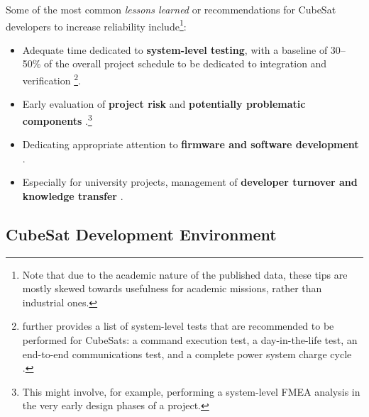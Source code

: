 \documentclass[a4paper,nobib,justified,final]{tufte-book}
\begin{document}
Some of the most common \emph{lessons learned} or recommendations for CubeSat developers to increase reliability include\footnote{Note that due to the academic nature of the published data, these tips are mostly skewed towards usefulness for academic missions, rather than industrial ones.}:\label{sec:LITERATURE_cubesat_systemic}
\begin{itemize}[itemsep=-1ex]
	\item Adequate time dedicated to \textbf{system-level testing}, with a baseline of 30--50\% of the overall project schedule to be dedicated to integration and verification
	\cite{swartwoutUniversityClassSpacecraft2023,venturiniImprovingMissionSuccess2017,langerReliabilityAssessmentReliability2018}\footnote{\citeauthor{venturiniImprovingMissionSuccess2017} further provides a list of system-level tests that are recommended to be performed for CubeSats: a command execution test, a day-in-the-life test, an end-to-end communications test, and a complete power system charge cycle \cite{venturiniImprovingMissionSuccess2017}.}.
	\item Early evaluation of \textbf{project risk} and \textbf{potentially problematic components} \cite{venturiniImprovingMissionSuccess2017,sanchoLessonsLearnedFYS2021}.\footnote{This might involve, for example, performing a system-level \acs{FMEA} analysis in the very early design phases of a project.}
	\item Dedicating appropriate attention to \textbf{firmware and software development} \cite{venturiniImprovingMissionSuccess2017,sanchoLessonsLearnedFYS2021}.
	\item Especially for university projects, management of \textbf{developer turnover and knowledge transfer} \cite{venturiniImprovingMissionSuccess2017,sanchoLessonsLearnedFYS2021,swartwoutUniversityClassSpacecraft2023}.
\end{itemize}


\subsection{CubeSat Development Environment}
\label{sec:LITERATURE_cubesat_environment}
\end{document}
